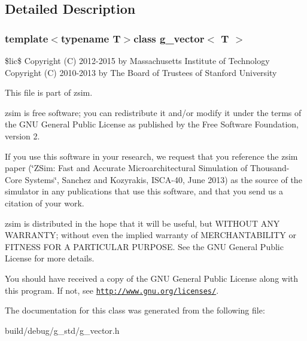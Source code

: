 \subsection{Detailed Description}
\subsubsection*{template$<$typename T$>$class g\-\_\-vector$<$ T $>$}

\$lic\$ Copyright (C) 2012-\/2015 by Massachusetts Institute of Technology Copyright (C) 2010-\/2013 by The Board of Trustees of Stanford University

This file is part of zsim.

zsim is free software; you can redistribute it and/or modify it under the terms of the G\-N\-U General Public License as published by the Free Software Foundation, version 2.

If you use this software in your research, we request that you reference the zsim paper (\char`\"{}\-Z\-Sim\-: Fast and Accurate Microarchitectural Simulation of
\-Thousand-\/\-Core Systems\char`\"{}, Sanchez and Kozyrakis, I\-S\-C\-A-\/40, June 2013) as the source of the simulator in any publications that use this software, and that you send us a citation of your work.

zsim is distributed in the hope that it will be useful, but W\-I\-T\-H\-O\-U\-T A\-N\-Y W\-A\-R\-R\-A\-N\-T\-Y; without even the implied warranty of M\-E\-R\-C\-H\-A\-N\-T\-A\-B\-I\-L\-I\-T\-Y or F\-I\-T\-N\-E\-S\-S F\-O\-R A P\-A\-R\-T\-I\-C\-U\-L\-A\-R P\-U\-R\-P\-O\-S\-E. See the G\-N\-U General Public License for more details.

You should have received a copy of the G\-N\-U General Public License along with this program. If not, see \href{http://www.gnu.org/licenses/}{\tt http\-://www.\-gnu.\-org/licenses/}. 

The documentation for this class was generated from the following file\-:\begin{DoxyCompactItemize}
\item 
build/debug/g\-\_\-std/g\-\_\-vector.\-h\end{DoxyCompactItemize}
